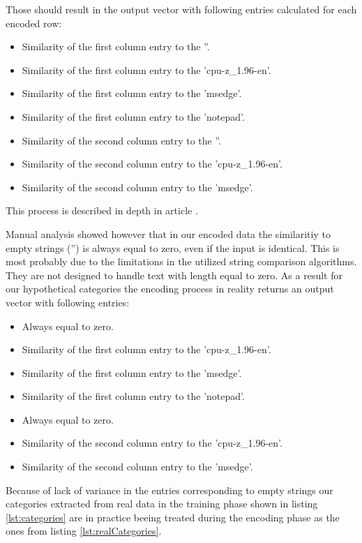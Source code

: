 \documentclass[a4paper,twoside,12pt]{book}
\begin{document}
Those should result in the output vector with following entries calculated for each encoded row:

\begin{itemize}
	\item Similarity of the first column entry to the ''.
	\item Similarity of the first column entry to the 'cpu-z\_1.96-en'.
	\item Similarity of the first column entry to the 'msedge'.
	\item Similarity of the first column entry to the 'notepad'.
	\item Similarity of the second column entry to the ''.
	\item Similarity of the second column entry to the 'cpu-z\_1.96-en'.
	\item Similarity of the second column entry to the 'msedge'.
\end{itemize}

This process is described in depth in article \cite{bib:dirtycat}.

Manual analysis showed however that in our encoded data the similaritiy to empty strings ('') is 
always equal to zero, even if the input is identical. This is most probably due to the limitations 
in the utilized string comparison algorithms. They are not designed to handle text with length equal to zero.
As a result for our hypothetical categories the encoding process in reality returns an output vector with 
following entries:
\begin{itemize}
	\item Always equal to zero.
	\item Similarity of the first column entry to the 'cpu-z\_1.96-en'.
	\item Similarity of the first column entry to the 'msedge'.
	\item Similarity of the first column entry to the 'notepad'.
	\item Always equal to zero.
	\item Similarity of the second column entry to the 'cpu-z\_1.96-en'.
	\item Similarity of the second column entry to the 'msedge'.
\end{itemize}

Because of lack of variance in the entries corresponding to empty strings our categories extracted 
from real data in the training phase shown in listing \ref{lst:categories} are in practice beeing treated 
during the encoding phase as the ones from listing \ref{lst:realCategories}.
\end{document}
